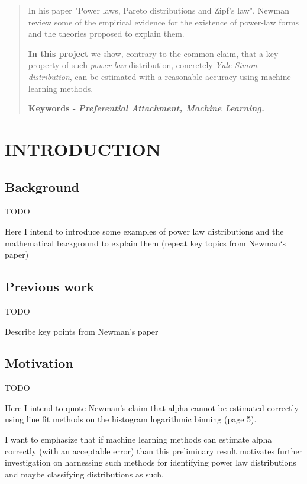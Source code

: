 \documentclass[a4paper, 12pt]{report}
\begin{document}
\begin{frontmatter}
\begin{abstract}
In his paper "Power laws, Pareto distributions and Zipf’s law", Newman review some of the empirical evidence for the existence of power-law forms and the theories proposed to explain them.


{\bf In this project} we show, contrary to the common claim, that a key property of such \textit{power law} distribution, concretely  \textit{Yule-Simon distribution}, can be estimated with a reasonable accuracy using machine learning methods.

\vspace{0.3cm}

\textbf{Keywords - }\it{\textbf{Preferential Attachment, Machine Learning.}}
\end{abstract}
\end{frontmatter}

\newpage
{}
\chapter{INTRODUCTION}

\section{Background}
TODO

Here I intend to introduce some examples of power law distributions and the mathematical background to explain them (repeat key topics from Newman`s paper)

\section{Previous work}
TODO

Describe key points from Newman's paper

\section{Motivation}
TODO

Here I intend to quote Newman's claim that alpha cannot be estimated correctly using line fit methods on the histogram logarithmic binning (page 5).

I want to emphasize that if machine learning methods can estimate alpha correctly (with an acceptable error) than this preliminary result motivates further investigation on harnessing such methods for identifying power law distributions and maybe classifying distributions as such.
\end{document}
